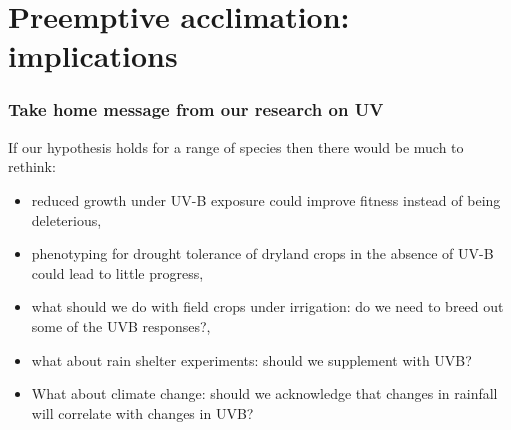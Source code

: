 \documentclass[10pt]{beamer}\usepackage[]{graphicx}\usepackage[]{color}
\begin{document}

\section{Preemptive acclimation: implications}

\begin{frame}
  \frametitle{Take home message from our research on UV}
  If our hypothesis holds for a range of species then there would be much to rethink:
  \begin{itemize}
    \item reduced growth under UV-B exposure could improve fitness instead of being deleterious,
    \item phenotyping for drought tolerance of dryland crops in the absence of UV-B could lead to little progress,
    \item what should we do with field crops under irrigation: do we need to breed out some of the UVB responses?,
    \item what about rain shelter experiments: should we supplement with UVB?
    \item What about climate change: should we acknowledge that changes in rainfall will correlate with changes in UVB?
  \end{itemize}
\end{frame}
\end{document}
